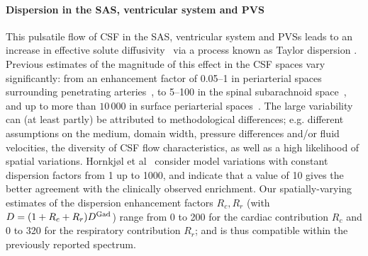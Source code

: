 \paragraph{Dispersion in the SAS, ventricular system and PVS}
This pulsatile flow of CSF in the SAS, ventricular system and PVSs
leads to an increase in effective solute
diffusivity~\cite{stockman2007effect, hettiarachchi2011effect,
  asgari2016glymphatic, sharp2019dispersion, ray2021quantitative} via
a process known as Taylor dispersion \cite{taylor1953dispersion,
  watson1983diffusion}. Previous estimates of the magnitude of this
effect in the CSF spaces vary significantly: from an enhancement
factor of 0.05--1 in periarterial spaces surrounding penetrating
arteries~\cite{asgari2016glymphatic, troyetsky2021dispersion}, to
5--100 in the spinal subarachnoid space~\cite{stockman2007effect,
  hettiarachchi2011effect, sharp2019dispersion}, and up to more than
$10\,000$ in surface periarterial spaces~\cite{ray2021quantitative,
  sharp2019dispersion}. The large variability can (at least partly) be
attributed to methodological differences; e.g. different assumptions
on the medium, domain width, pressure differences and/or fluid
velocities, the diversity of CSF flow characteristics, as well as a
high likelihood of spatial variations. Hornkjøl et
al~\cite{hornkjol2022csf} consider model variations with constant
dispersion factors from 1 up to 1000, and indicate that a value of 10
gives the better agreement with the clinically observed
enrichment. Our spatially-varying estimates of the dispersion
enhancement factors $R_c, R_r$ (with $D = (1 + R_c + R_r) D^{\rm
  Gad}$) range from 0 to 200 for the cardiac contribution $R_c$ and 0
to 320 for the respiratory contribution $R_r$; and is thus compatible
within the previously reported spectrum.

